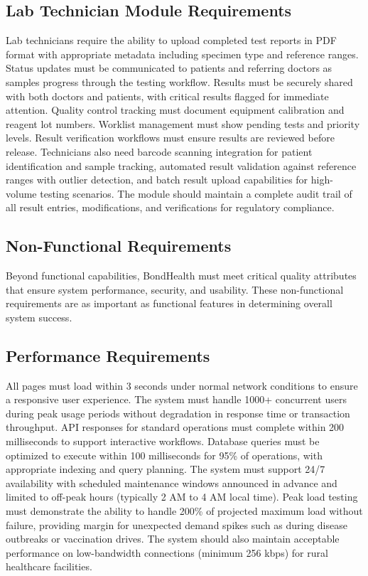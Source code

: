 \subsection{Lab Technician Module Requirements}

\justifying
\noindent Lab technicians require the ability to upload completed test reports in PDF format with appropriate metadata including specimen type and reference ranges. Status updates must be communicated to patients and referring doctors as samples progress through the testing workflow. Results must be securely shared with both doctors and patients, with critical results flagged for immediate attention. Quality control tracking must document equipment calibration and reagent lot numbers. Worklist management must show pending tests and priority levels. Result verification workflows must ensure results are reviewed before release. Technicians also need barcode scanning integration for patient identification and sample tracking, automated result validation against reference ranges with outlier detection, and batch result upload capabilities for high-volume testing scenarios. The module should maintain a complete audit trail of all result entries, modifications, and verifications for regulatory compliance.

\subsection{Non-Functional Requirements}

\justifying
\noindent Beyond functional capabilities, BondHealth must meet critical quality attributes that ensure system performance, security, and usability. These non-functional requirements are as important as functional features in determining overall system success.

\subsection{Performance Requirements}

\justifying
\noindent All pages must load within 3 seconds under normal network conditions to ensure a responsive user experience. The system must handle 1000+ concurrent users during peak usage periods without degradation in response time or transaction throughput. API responses for standard operations must complete within 200 milliseconds to support interactive workflows. Database queries must be optimized to execute within 100 milliseconds for 95\% of operations, with appropriate indexing and query planning. The system must support 24/7 availability with scheduled maintenance windows announced in advance and limited to off-peak hours (typically 2 AM to 4 AM local time). Peak load testing must demonstrate the ability to handle 200\% of projected maximum load without failure, providing margin for unexpected demand spikes such as during disease outbreaks or vaccination drives. The system should also maintain acceptable performance on low-bandwidth connections (minimum 256 kbps) for rural healthcare facilities.

